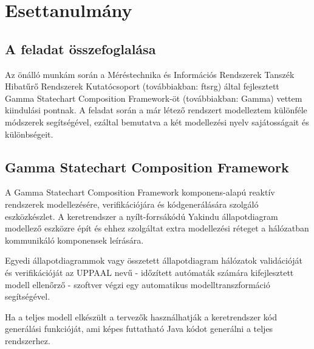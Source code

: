 \chapter{Esettanulmány}
\section{A  feladat összefoglalása}
Az önálló munkám során a Méréstechnika és Információs Rendszerek Tanszék Hibatűrő Rendszerek Kutatócsoport (továbbiakban: ftsrg) által fejlesztett Gamma Statechart Composition Framework-öt (továbbiakban: Gamma) vettem kiindulási pontnak.
A feladat során a már létező rendszert modelleztem különféle módszerek segítségével, ezáltal bemutatva a két modellezési nyelv sajátosságait és különbségeit.

\section{Gamma Statechart Composition Framework}
A Gamma Statechart Composition Framework komponens-alapú reaktív rendszerek modellezésére, verifikációjára és kódgenerálására szolgáló eszközkészlet.
A keretrendszer a nyílt-forrsákódú Yakindu állapotdiagram modellező eszközre épít és ehhez szolgáltat extra modellezési réteget a hálózatban kommunikáló komponensek leírására.\cite{molnar2018gamma}

Egyedi állapotdiagrammok vagy összetett állapotdiagram hálózatok validációját és verifikációját az UPPAAL nevű - időzített autómaták számára kifejlesztett modell ellenőrző - szoftver végzi egy automatikus modelltranszformáció segítségével.

Ha a teljes modell elkészült a tervezők használhatják a keretrendszer kód generálási funkcióját, ami képes futtatható Java kódot generálni a teljes rendszerhez.
